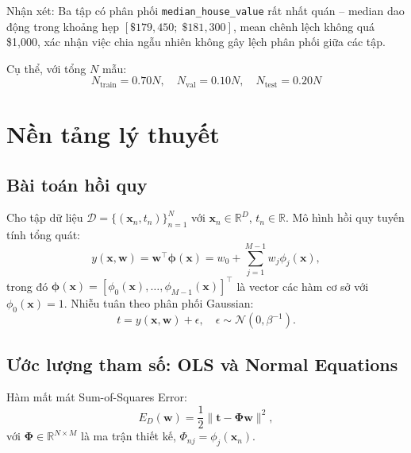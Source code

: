 \documentclass[12pt, a4paper]{article}
\begin{document}
Nhận xét: Ba tập có phân phối \texttt{median\_house\_value} rất nhất
quán -- median dao động trong khoảng hẹp
$[\$179{,}450;\; \$181{,}300]$, mean chênh lệch không quá \$1{,}000,
xác nhận việc chia ngẫu nhiên không gây lệch phân phối giữa các tập.

Cụ thể, với tổng $N$ mẫu:
$$N_{\text{train}} = 0.70N, \quad N_{\text{val}} = 0.10N, \quad N_{\text{test}} = 0.20N$$

\section{Nền tảng lý thuyết}
\label{sec:theory}

\subsection{Bài toán hồi quy}

Cho tập dữ liệu $\mathcal{D} = \{(\mathbf{x}_n, t_n)\}_{n=1}^{N}$ với
$\mathbf{x}_n \in \mathbb{R}^D$, $t_n \in \mathbb{R}$. Mô hình hồi quy tuyến tính
tổng quát:
\begin{equation}
  y(\mathbf{x}, \mathbf{w}) = \mathbf{w}^\top \boldsymbol{\phi}(\mathbf{x})
  = w_0 + \sum_{j=1}^{M-1} w_j \phi_j(\mathbf{x}),
  \label{eq:linear_model}
\end{equation}
trong đó $\boldsymbol{\phi}(\mathbf{x}) = [\phi_0(\mathbf{x}), \dots, \phi_{M-1}(\mathbf{x})]^\top$
là vector các hàm cơ sở với $\phi_0(\mathbf{x}) = 1$. Nhiễu tuân theo phân phối Gaussian:
\begin{equation}
  t = y(\mathbf{x}, \mathbf{w}) + \epsilon, \quad \epsilon \sim \mathcal{N}(0, \beta^{-1}).
  \label{eq:noise_model}
\end{equation}

\subsection{Ước lượng tham số: OLS và Normal Equations}

Hàm mất mát Sum-of-Squares Error:
\begin{equation}
  E_D(\mathbf{w}) = \frac{1}{2}\|\mathbf{t} - \boldsymbol{\Phi}\mathbf{w}\|^2,
  \label{eq:ols_loss}
\end{equation}
với $\boldsymbol{\Phi} \in \mathbb{R}^{N \times M}$ là ma trận thiết kế, $\Phi_{nj} = \phi_j(\mathbf{x}_n)$.
\end{document}

